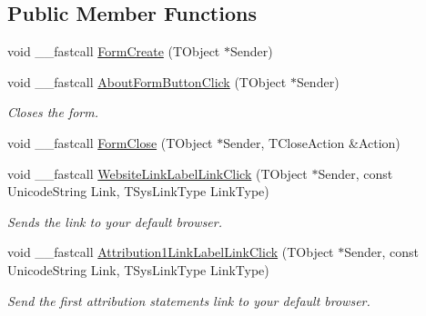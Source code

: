 \subsection*{Public Member Functions}
\begin{DoxyCompactItemize}
\item 
void \+\_\+\+\_\+fastcall \mbox{\hyperlink{class_t_about_form_ad2cb3d318c91018ed8986c8315ccd52b}{Form\+Create}} (T\+Object $\ast$Sender)
\item 
\mbox{\label{class_t_about_form_a8e868f7264a80fda52fc8c0e8290eb3f}} 
void \+\_\+\+\_\+fastcall \mbox{\hyperlink{class_t_about_form_a8e868f7264a80fda52fc8c0e8290eb3f}{About\+Form\+Button\+Click}} (T\+Object $\ast$Sender)
\begin{DoxyCompactList}\small\item\em Closes the form. \end{DoxyCompactList}\item 
void \+\_\+\+\_\+fastcall \mbox{\hyperlink{class_t_about_form_acddaba886282fa0cb6aa0ee77520fb05}{Form\+Close}} (T\+Object $\ast$Sender, T\+Close\+Action \&Action)
\item 
\mbox{\label{class_t_about_form_a6c7cc55bc67691c15901fdeac8bec954}} 
void \+\_\+\+\_\+fastcall \mbox{\hyperlink{class_t_about_form_a6c7cc55bc67691c15901fdeac8bec954}{Website\+Link\+Label\+Link\+Click}} (T\+Object $\ast$Sender, const Unicode\+String Link, T\+Sys\+Link\+Type Link\+Type)
\begin{DoxyCompactList}\small\item\em Sends the link to your default browser. \end{DoxyCompactList}\item 
\mbox{\label{class_t_about_form_a8699bacd9787f153b92c579a4ea60871}} 
void \+\_\+\+\_\+fastcall \mbox{\hyperlink{class_t_about_form_a8699bacd9787f153b92c579a4ea60871}{Attribution1\+Link\+Label\+Link\+Click}} (T\+Object $\ast$Sender, const Unicode\+String Link, T\+Sys\+Link\+Type Link\+Type)
\begin{DoxyCompactList}\small\item\em Send the first attribution statement\textquotesingle{}s link to your default browser. \end{DoxyCompactList}\item 
\mbox{\label{class_t_about_form_a16a26ef9958f3cdb5a0850f70d274e21}} 

\end{DoxyCompactItemize}
